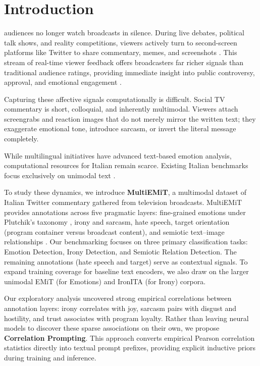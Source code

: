 \section{Introduction}
 audiences no longer watch broadcasts in silence. During live debates, political talk shows, and reality competitions, viewers actively turn to second-screen platforms like Twitter to share commentary, memes, and screenshots \cite{SocialTV}. This stream of real-time viewer feedback offers broadcasters far richer signals than traditional audience ratings, providing immediate insight into public controversy, approval, and emotional engagement \cite{memorai}. 

Capturing these affective signals computationally is difficult. Social TV commentary is short, colloquial, and inherently multimodal. Viewers attach screengrabs and reaction images that do not merely mirror the written text; they exaggerate emotional tone, introduce sarcasm, or invert the literal message completely. 

While multilingual initiatives have advanced text-based emotion analysis, computational resources for Italian remain scarce. Existing Italian benchmarks focus exclusively on unimodal text \cite{bianchi2021feel, emit, MultiEmotion} .

To study these dynamics, we introduce \textbf{MultiEMiT}, a multimodal dataset of Italian Twitter commentary gathered from television broadcasts. MultiEMiT provides annotations across five pragmatic layers: fine-grained emotions under Plutchik's taxonomy \cite{Plutchik}, irony and sarcasm, hate speech, target orientation (program container versus broadcast content), and semiotic text--image relationships \cite{MultiM}. Our benchmarking focuses on three primary classification tasks: Emotion Detection, Irony Detection, and Semiotic Relation Detection. The remaining annotations (hate speech and target) serve as contextual signals. To expand training coverage for baseline text encoders, we also draw on the larger unimodal EMiT (for Emotions) \cite{emit} and IronITA (for Irony) \cite{ironita2018} corpora.

Our exploratory analysis uncovered strong empirical correlations between annotation layers: irony correlates with joy, sarcasm pairs with disgust and hostility, and trust associates with program loyalty. Rather than leaving neural models to discover these sparse associations on their own, we propose \textbf{Correlation Prompting}. This approach converts empirical Pearson correlation statistics directly into textual prompt prefixes, providing explicit inductive priors during training and inference.

